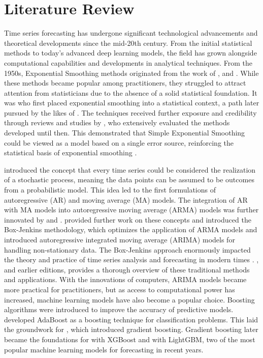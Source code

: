 \documentclass[12pt,a4paper]{article}
\begin{document}
\section{Literature Review}
Time series forecasting has undergone significant technological advancements and theoretical developments since the mid-20th century. From the initial statistical methods to today's advanced deep learning models, the field has grown alongside computational capabilities and developments in analytical techniques. From the 1950s, Exponential Smoothing methods originated from the work of \cite{Brown1959,brown1963smoothing}, \cite{holt1957forecasting} and \cite{Winters1960ForecastingSB}. While these methods became popular among practitioners, they struggled to attract attention from statisticians due to the absence of a solid statistical foundation. It was \cite{Muth1960} who first placed exponential smoothing into a statistical context, a path later pursued by the likes of \cite{box1970time}. The techniques received further exposure and credibility through reviews and studies by \cite{Gardner1985}, who extensively evaluated the methods developed until then. This demonstrated that Simple Exponential Smoothing could be viewed as a model based on a single error source, reinforcing the statistical basis of exponential smoothing \parencite{DEGOOIJER2006443}.

\cite{Yule1927} introduced the concept that every time series could be considered the realization of a stochastic process, meaning the data points can be assumed to be outcomes from a probabilistic model. This idea led to the first formulations of autoregressive (AR) and moving average (MA) models. The integration of AR with MA models into autoregressive moving average (ARMA) models was further innovated by \cite{Slutzky1937} and \cite{wold1939}. \cite{box1970time} provided further work on these concepts and introduced the Box-Jenkins methodology, which optimizes the application of ARMA models and introduced autoregressive integrated moving average (ARIMA) models for handling non-stationary data. The Box-Jenkins approach enormously impacted the theory and practice of time series analysis and forecasting in modern times \parencite{DEGOOIJER2006443}. \cite{HyndmanForecasting2021}, and earlier editions, provides a thorough overview of these traditional methods and applications. With the innovations of computers, ARIMA models became more practical for practitioners, but as access to computational power has increased, machine learning models have also become a popular choice. Boosting algorithms were introduced to improve the accuracy of predictive models. \cite{Freund1997} developed AdaBoost as a boosting technique for classification problems. This laid the groundwork for \cite{Friedman2001}, which introduced gradient boosting. Gradient boosting later became the foundations for \cite{chen2016} with XGBoost and \cite{guolin2017} with LightGBM, two of the most popular machine learning models for forecasting in recent years.
\end{document}
